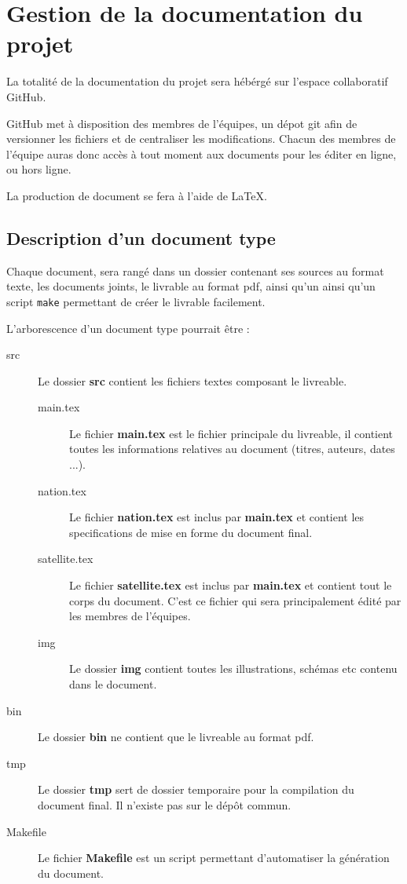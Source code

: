 \section{Gestion de la documentation du projet}

La totalité de la documentation du projet sera hébérgé sur l'espace collaboratif GitHub.

GitHub met à disposition des membres de l'équipes, un dépot git afin de versionner les fichiers et de centraliser les modifications.
Chacun des membres de l’équipe auras donc accès à tout moment aux documents pour les éditer en ligne, ou hors ligne.

La production de document se fera à l’aide de LaTeX.

\subsection{Description d'un document type}

Chaque document, sera rangé dans un dossier contenant ses sources au format texte, les documents joints, le livrable au format pdf, ainsi qu'un  ainsi qu'un script \texttt{make} permettant de créer le livrable facilement.

L'arborescence d'un document type pourrait être :
\begin{description}
    \item[src]{Le dossier {\bf src} contient les fichiers textes composant le livreable.}
    \begin{description}
        \item[main.tex]{Le fichier {\bf main.tex} est le fichier principale du livreable, il contient toutes les informations relatives au document (titres, auteurs, dates ...).}
        \item[nation.tex] {Le fichier {\bf nation.tex} est inclus par {\bf main.tex} et contient les specifications de mise en forme du document final.}
        \item[satellite.tex] {Le fichier {\bf satellite.tex} est inclus par {\bf main.tex} et contient tout le corps du document. C'est ce fichier qui sera principalement édité par les membres de l'équipes.}
        \item[img] {Le dossier {\bf img} contient toutes les illustrations, schémas etc contenu dans le document.}
    \end{description}
    \item [bin]{Le dossier {\bf bin} ne contient que le livreable au format pdf.}
    \item [tmp]{Le dossier {\bf tmp} sert de dossier temporaire pour la compilation du document final. Il n'existe pas sur le dépôt commun.}
    \item [Makefile]{Le fichier {\bf Makefile} est un script permettant d'automatiser la génération du document.}
\end{description}

